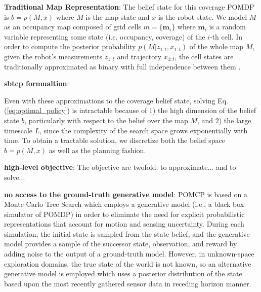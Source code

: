 \documentclass{article}
\newcommand{\ph}[1]{{\textbf{#1}:}} %
\begin{document}
\ph{Traditional Map Representation} The belief state for this coverage POMDP is $b = p(M, x)$ where $M$ is the map state and $x$ is the robot state. We model $M$ as an occupancy map composed of grid cells  $m = \{\textbf{m}_i\}$ where $\mathbf{m}_i$ is a random variable representing some state (i.e. occupancy, coverage) of the $i$-th cell. In order to compute the posterior probability $p(M | z_{1:t}, x_{1:t})$ of the whole map $M$, given the robot's measurements $z_{1:t}$ and trajectory $x_{1:t}$, the cell states are traditionally approximated as binary with full independence between them \cite{TBF05,elfes1990stochastic}. %

\ph{sbtcp formualtion}

Even with these approximations to the coverage belief state, solving Eq. (\ref{eq:optimal_policy}) is intractable because of 1) the high dimension of the belief state $b$, particularly with respect to the belief over the map $M$, and 2) the large timescale $L$, since the complexity of the search space grows exponentially with time. To obtain a tractable solution, we discretize both the belief space $b=p(M,x)$ as well as the planning fashion. 


\ph{high-level objective}
The objective are twofold: to approximate... and to solve...


\ph{no access to the ground-truth generative model}
POMCP \cite{silver2010monte} is based on a Monte Carlo Tree Search which employs a generative model (i.e., a black box simulator of POMDP) in order to eliminate the need for explicit probabilistic representations that account for motion and sensing uncertainty. During each simulation, the initial state is sampled from the state belief, and the generative model provides a sample of the successor state, observation, and reward by adding noise to the output of a ground-truth model. However, in unknown-space exploration domains, the true state of the world is not known, so an alternative generative model is employed which uses a posterior distribution of the state based upon the most recently gathered sensor data in receding horizon manner. 


\end{document}
